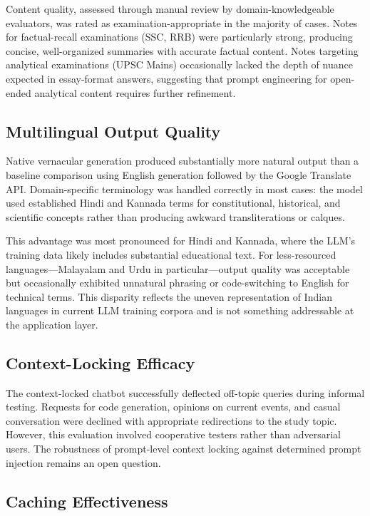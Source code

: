 \documentclass[conference]{IEEEtran}
\begin{document}
Content quality, assessed through manual review by domain-knowledgeable evaluators, was rated as examination-appropriate in the majority of cases. Notes for factual-recall examinations (SSC, RRB) were particularly strong, producing concise, well-organized summaries with accurate factual content. Notes targeting analytical examinations (UPSC Mains) occasionally lacked the depth of nuance expected in essay-format answers, suggesting that prompt engineering for open-ended analytical content requires further refinement.

\subsection{Multilingual Output Quality}

Native vernacular generation produced substantially more natural output than a baseline comparison using English generation followed by the Google Translate API. Domain-specific terminology was handled correctly in most cases: the model used established Hindi and Kannada terms for constitutional, historical, and scientific concepts rather than producing awkward transliterations or calques.

This advantage was most pronounced for Hindi and Kannada, where the LLM's training data likely includes substantial educational text. For less-resourced languages---Malayalam and Urdu in particular---output quality was acceptable but occasionally exhibited unnatural phrasing or code-switching to English for technical terms. This disparity reflects the uneven representation of Indian languages in current LLM training corpora and is not something addressable at the application layer.

\subsection{Context-Locking Efficacy}

The context-locked chatbot successfully deflected off-topic queries during informal testing. Requests for code generation, opinions on current events, and casual conversation were declined with appropriate redirections to the study topic. However, this evaluation involved cooperative testers rather than adversarial users. The robustness of prompt-level context locking against determined prompt injection remains an open question.

\subsection{Caching Effectiveness}
\end{document}
